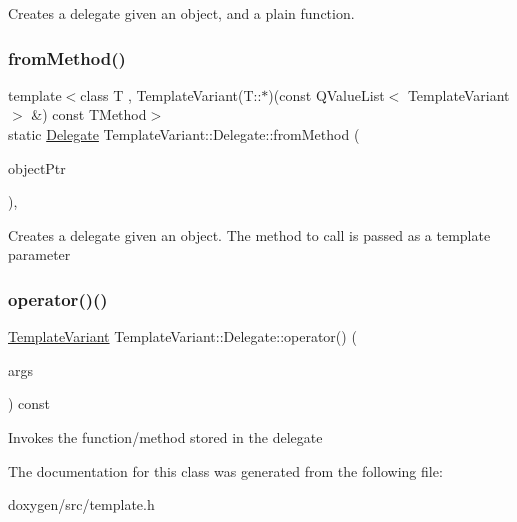 Creates a delegate given an object, and a plain function. \mbox{\label{class_template_variant_1_1_delegate_a6a013222ab665507469657d09c07c92b}} 
\subsubsection{\texorpdfstring{fromMethod()}{fromMethod()}}
{\footnotesize\ttfamily template$<$class T , Template\+Variant(\+T\+::$\ast$)(const Q\+Value\+List$<$ Template\+Variant $>$ \&) const T\+Method$>$ \\
static \mbox{\hyperlink{class_template_variant_1_1_delegate}{Delegate}} Template\+Variant\+::\+Delegate\+::from\+Method (\begin{DoxyParamCaption}\item[{const T $\ast$}]{object\+Ptr }\end{DoxyParamCaption})\hspace{0.3cm}{\ttfamily [inline]}, {\ttfamily [static]}}

Creates a delegate given an object. The method to call is passed as a template parameter \mbox{\label{class_template_variant_1_1_delegate_ae9fa32df07f63320a443d949a841945a}} 
\subsubsection{\texorpdfstring{operator()()}{operator()()}}
{\footnotesize\ttfamily \mbox{\hyperlink{class_template_variant}{Template\+Variant}} Template\+Variant\+::\+Delegate\+::operator() (\begin{DoxyParamCaption}\item[{const \mbox{\hyperlink{class_q_value_list}{Q\+Value\+List}}$<$ \mbox{\hyperlink{class_template_variant}{Template\+Variant}} $>$ \&}]{args }\end{DoxyParamCaption}) const\hspace{0.3cm}{\ttfamily [inline]}}

Invokes the function/method stored in the delegate 

The documentation for this class was generated from the following file\+:\begin{DoxyCompactItemize}
\item 
doxygen/src/template.\+h\end{DoxyCompactItemize}
